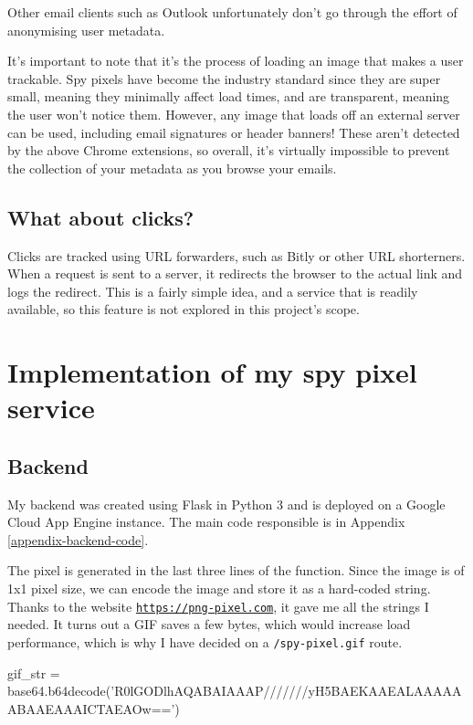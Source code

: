 \documentclass{article}
\begin{document}
Other email clients such as Outlook unfortunately don't go through the effort of anonymising user metadata.

It's important to note that it's the process of loading an image that makes a user trackable. Spy pixels have become the industry standard since they are super small, meaning they minimally affect load times, and are transparent, meaning the user won't notice them. However, any image that loads off an external server can be used, including email signatures or header banners! These aren't detected by the above Chrome extensions, so overall, it's virtually impossible to prevent the collection of your metadata as you browse your emails.

\subsection{What about clicks?}

Clicks are tracked using URL forwarders, such as Bitly or other URL shorterners. When a request is sent to a server, it redirects the browser to the actual link and logs the redirect. This is a fairly simple idea, and a service that is readily available, so this feature is not explored in this project's scope.

\section{Implementation of my spy pixel service}

\subsection{Backend}

My backend was created using Flask in Python 3 and is deployed on a Google Cloud App Engine instance. The main code responsible is in Appendix \ref{appendix-backend-code}.

The pixel is generated in the last three lines of the function. Since the image is of 1x1 pixel size, we can encode the image and store it as a hard-coded string. Thanks to the website \href{https://png-pixel.com}{\texttt{https://png-pixel.com}}, it gave me all the strings I needed. It turns out a GIF saves a few bytes, which would increase load performance, which is why I have decided on a \texttt{/spy-pixel.gif} route.

\begin{python}
gif_str = base64.b64decode('R0lGODlhAQABAIAAAP///////yH5BAEKAAEALAAAAAABAAEAAAICTAEAOw==')
\end{python}
\end{document}
